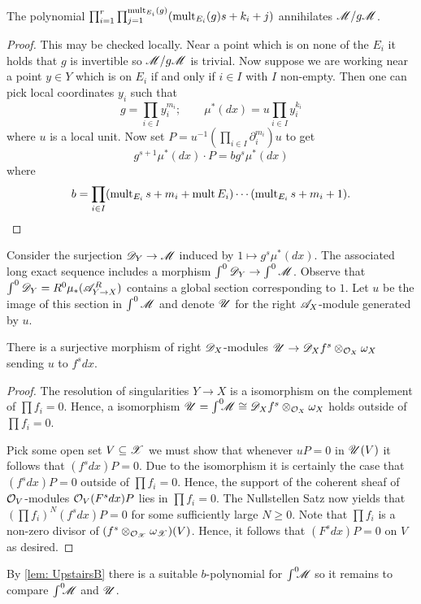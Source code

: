 \begin{lemma}\label{lem: UpstairsB}
  The polynomial $\prod_{i=1}^r \prod_{j=1}^{\operatorname{mult}_{E_i}(g)} (\operatorname{mult}_{E_i}(g)s + k_i + j)$ annihilates $\mathscr{M} / g\mathscr{M}$.
\end{lemma}
\begin{proof}
  This may be checked locally.
  Near a point which is on none of the $E_i$ it holds that $g$ is invertible so $\mathscr{M}/g\mathscr{M}$ is trivial.
  Now suppose we are working near a point $y\in Y$ which is on $E_i$ if and only if $i\in I$ with $I$ non-empty.
  Then one can pick local coordinates $y_i$ such that
  $$ g = \prod_{i\in I} y_i^{m_i}; \qquad \mu^*(dx) =u \prod_{i\in I} y_i^{k_i}$$
  where $u$ is a local unit.
  Now set $P = u^{-1}(\prod_{i\in I}\partial_i^{m_i})u$ to get
  $$g^{s+1} \mu^*(dx)\cdot P = b g^s \mu^*(dx)$$
  where
  $$b = \prod_{i\in I} (\operatorname{mult}_{E_i}s +  m_i + \operatorname{mult}{E_i} )\cdots (\operatorname{mult}_{E_i}s + m_i + 1 ). $$
\end{proof}
Consider the surjection $\mathscr{D}_Y\to \mathscr{M}$ induced by $1 \mapsto g^s \mu^*(dx)$.
The associated long exact sequence includes a morphism $\int^0\mathscr{D}_Y \to \int^0\mathscr{M}$. Observe that $\int^0\mathscr{D}_Y = R^0 \mu_*(\mathscr{A}_{Y\to X}^R)$ contains a global section corresponding to $1$.
Let $u$ be the image of this section in $\int^0\mathscr{M}$ and denote $\mathscr{U}$ for the right $\mathscr{A}_X$-module generated by $u$.
\begin{lemma}
  There is a surjective morphism of right $\mathscr{D}_X$-modules $\mathscr{U} \to \mathscr{D}_X f^s \otimes_{\mathcal{O}_X} \omega_X$ sending $u$ to $f^s dx$.
\end{lemma}
\begin{proof}
   The resolution of singularities $Y\to X$ is a isomorphism on the complement of $\prod f_i = 0$. Hence, a isomorphism $\mathscr{U} = \int^0 \mkern -8mu \mathscr{M} \cong  \mathscr{D}_X f^s  \otimes_{\mathcal{O}_X}\omega_X$ holds outside of $\prod f_i = 0$.

  Pick some open set $V\subseteq \mathscr{X}$ we must show that whenever $uP = 0$ in $\mathscr{U}(V)$ it follows that $(f^s dx)P = 0$.
  Due to the isomorphism it is certainly the case that $(f^s dx) P = 0$ outside of $\prod f_i = 0$.
  Hence, the support of the coherent sheaf of $\mathcal{O}_V$-modules $\mathcal{O}_V (F^s dx) P $ lies in $\prod f_i = 0$.
  The Nullstellen Satz now yields that $(\prod f_i)^N (f^s dx) P  = 0$ for some sufficiently large $N\geq 0$.
  Note that $\prod f_i$ is a non-zero divisor of $(f^s\otimes_{\mathcal{O}_{\mathscr{X}}} \omega_{\mathscr{X}})(V)$. Hence, it follows that $(F^s dx) P= 0$ on $V$ as desired.
\end{proof}
By \cref{lem: UpstairsB} there is a suitable $b$-polynomial for $\int^0 \mkern -8mu\mathscr{M}$ so it remains to compare $\int^0 \mkern -8mu\mathscr{M}$ and $\mathscr{U}$.
